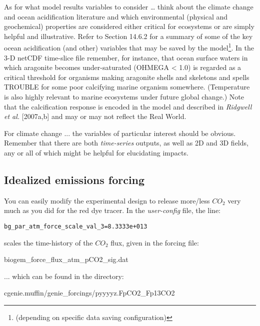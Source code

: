 \documentclass[11pt,fleqn]{book} %
\begin{document}
As for what model results variables to consider … think about the climate change and ocean acidification literature and which environmental (physical and geochemical) properties are considered either critical for ecosystems or are simply helpful and illustrative. Refer to Section 14.6.2 for a summary of some of the key ocean acidification (and other) variables that may be saved by the model\footnote{(depending on specific data saving configuration)}.
In the 3-D netCDF time-slice file remember, for instance, that ocean surface waters in which aragonite becomes under-saturated (OHMEGA < 1.0) is regarded as a critical threshold for organisms making aragonite shells and skeletons and spells TROUBLE for some poor calcifying marine organism somewhere. (Temperature is also highly relevant to marine ecosystems under future global change.) Note that the calcification response is encoded in the model and described in \textit{Ridgwell et al.} [2007a,b] and may or may not reflect the Real World.

For climate change ... the variables of particular interest should be obvious. Remember that there are both \textit{time-series} outputs, as well as  2D and 3D fields, any or all of which might be  helpful for elucidating impacts.


\subsection{Idealized emissions forcing}

\noindent You can easily modify the experimental design to release more/less \(CO_{2}\) very much as you did for the red dye tracer. In the \textit{user-config} file, the line:
\vspace{-2pt}\begin{verbatim}
bg_par_atm_force_scale_val_3=8.3333e+013
\end{verbatim}\vspace{-2pt}
scales the time-history of the  \(CO_{2}\) flux, given in the forcing file:

\vspace{2pt}
\noindent \footnotesize\textsf{biogem\_force\_flux\_atm\_pCO2\_sig.dat}\normalsize
\vspace{2pt}

\noindent ... which can be found in the directory:

\vspace{2pt}
\noindent \footnotesize\textsf{cgenie.muffin/genie\_forcings/pyyyyz.FpCO2\_Fp13CO2}\normalsize
\vspace{2pt}
\end{document}

